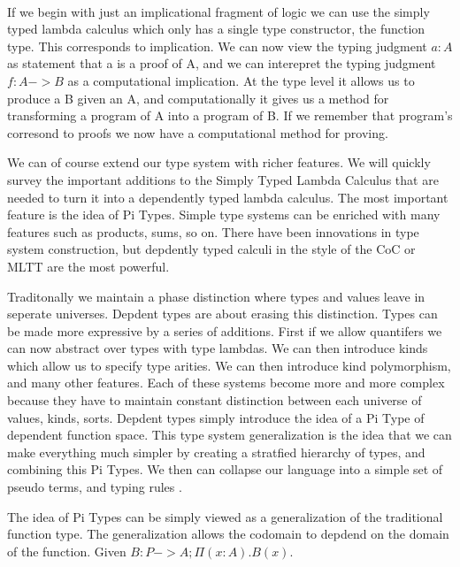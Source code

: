 \documentclass[12pt, titlepage]{article}
\begin{document}
 \\

If we begin with just an implicational fragment of logic we can use the simply typed lambda calculus which only has a
single type constructor, the function type. This corresponds to implication. We can now view the typing judgment $a : A$
as statement that a is a proof of A, and we can interepret the typing judgment $f : A -> B$ as a computational implication.
At the type level it allows us to produce a B given an A, and computationally it gives us a method for transforming a program
of A into a program of B. If we remember that program's corresond to proofs we now have a computational method for proving.

We can of course extend our type system with richer features. We will quickly survey the important additions to the Simply
Typed Lambda Calculus that are needed to turn it into a dependently typed lambda calculus. The most important feature
is the idea of Pi Types. Simple type systems can be enriched with many features such as products, sums, so on. There
have been innovations in type system construction, but depdently typed calculi in the style of the CoC or MLTT are
the most powerful. 

Traditonally we maintain a phase distinction where types and values leave in seperate universes. Depdent types
are about erasing this distinction. Types can be made more expressive by a series of additions. First if we
allow quantifers we can now abstract over types with type lambdas. We can then introduce kinds which allow us
to specify type arities. We can then introduce kind polymorphism, and many other features. Each of these systems become
more and more complex because they have to maintain constant distinction between each universe of values, kinds, sorts.
Depdent types simply introduce the idea of a Pi Type of dependent function space. This type system generalization is the 
idea that we can make everything much simpler by creating a stratfied hierarchy of types, and combining this Pi Types.
We then can collapse our language into a simple set of pseudo terms, and typing rules .

The idea of Pi Types can be simply viewed as a generalization of the traditional function type. The generalization
allows the codomain to depdend on the domain of the function. Given $B : P -> A; \Pi (x : A). B(x)$.

\cite{HoTTbook} \cite{Pierce:TypeSystems}
\end{document}
